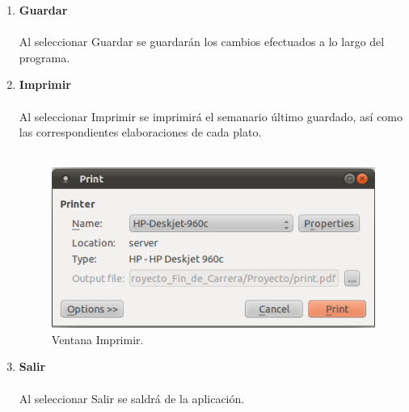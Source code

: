 \begin{enumerate}
\item \textbf{Guardar}\\\\
Al seleccionar Guardar se guardarán los cambios efectuados a lo largo del programa.
\item \textbf{Imprimir}\\\\
Al seleccionar Imprimir se imprimirá el semanario último guardado, así como las correspondientes elaboraciones de cada plato.\\\\
\begin{figure}[H]
  \label{imprimir}
  \begin{center}
    \includegraphics[scale=0.5]{../../Image/dietista-imprimir.png}
  \end{center}
  \caption{Ventana Imprimir.}
\end{figure}

\item \textbf{Salir}\\\\
Al seleccionar Salir se saldrá de la aplicación.\\\\
\end{enumerate}


